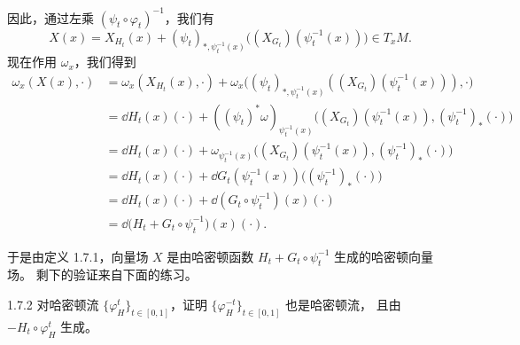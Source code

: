 因此，通过左乘 $(\psi_t\circ\varphi_t)^{-1}$，我们有
\[
  X(x)=X_{H_t}(x)+(\psi_t)_{*,\psi_t^{-1}(x)}
  \big((X_{G_t})(\psi_t^{-1}(x))\big)\in T_xM .
\]
现在作用 $\omega_x$，我们得到
\[
  \begin{aligned}
    \omega_x(X(x),\cdot)
    &=\omega_x(X_{H_t}(x),\cdot)
      +\omega_x\big((\psi_t)_{*,\psi_t^{-1}(x)}
      ((X_{G_t})(\psi_t^{-1}(x))),\cdot\big)\\
    &=\dd H_t(x)(\cdot)
      +((\psi_t)^*\omega)_{\psi_t^{-1}(x)}
      \big((X_{G_t})(\psi_t^{-1}(x)),(\psi_t^{-1})_*(\cdot)\big)\\
    &=\dd H_t(x)(\cdot)
      +\omega_{\psi_t^{-1}(x)}
      \big((X_{G_t})(\psi_t^{-1}(x)),(\psi_t^{-1})_*(\cdot)\big)\\
    &=\dd H_t(x)(\cdot)
      +\dd G_t(\psi_t^{-1}(x))\big((\psi_t^{-1})_*(\cdot)\big)\\
    &=\dd H_t(x)(\cdot)+\dd(G_t\circ\psi_t^{-1})(x)(\cdot)\\
    &=\dd\big(H_t+G_t\circ\psi_t^{-1}\big)(x)(\cdot).
  \end{aligned}
\]

于是由定义 1.7.1，向量场 $X$ 是由哈密顿函数 $H_t+G_t\circ\psi_t^{-1}$ 生成的哈密顿向量场。
剩下的验证来自下面的练习。

\begin{wexer}{1.7.2}
对哈密顿流 $\{\varphi_H^t\}_{t\in[0,1]}$，证明 $\{\varphi_H^{-t}\}_{t\in[0,1]}$ 也是哈密顿流，
且由 $-H_t\circ\varphi_H^t$ 生成。
\end{wexer}


